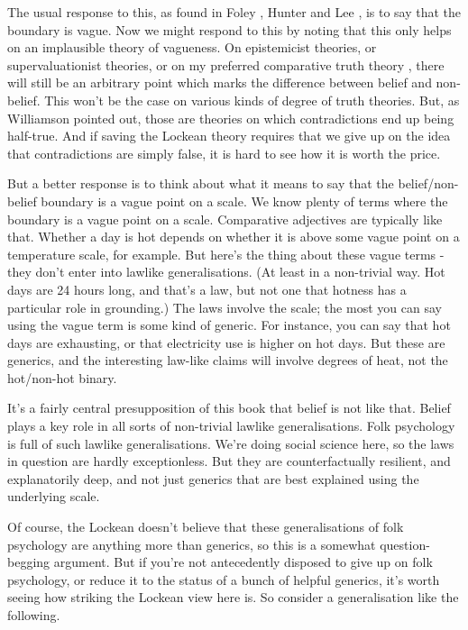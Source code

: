 \documentclass[
  11pt,
]{book}
\begin{document}
The usual response to this, as found in Foley \citeyearpar[ Ch. 4]{Foley1993}, Hunter \citeyearpar{Hunter1996} and Lee \citeyearpar{Lee2017b}, is to say that the boundary is vague. Now we might respond to this by noting that this only helps on an implausible theory of vagueness. On epistemicist theories, or supervaluationist theories, or on my preferred comparative truth theory \citep{Weatherson2005b}, there will still be an arbitrary point which marks the difference between belief and non-belief. This won't be the case on various kinds of degree of truth theories. But, as Williamson \citeyearpar{Williamson1994} pointed out, those are theories on which contradictions end up being half-true. And if saving the Lockean theory requires that we give up on the idea that contradictions are simply false, it is hard to see how it is worth the price.

But a better response is to think about what it means to say that the belief/non-belief boundary is a vague point on a scale. We know plenty of terms where the boundary is a vague point on a scale. Comparative adjectives are typically like that. Whether a day is hot depends on whether it is above some vague point on a temperature scale, for example. But here's the thing about these vague terms - they don't enter into lawlike generalisations. (At least in a non-trivial way. Hot days are 24 hours long, and that's a law, but not one that hotness has a particular role in grounding.) The laws involve the scale; the most you can say using the vague term is some kind of generic. For instance, you can say that hot days are exhausting, or that electricity use is higher on hot days. But these are generics, and the interesting law-like claims will involve degrees of heat, not the hot/non-hot binary.

It's a fairly central presupposition of this book that belief is not like that. Belief plays a key role in all sorts of non-trivial lawlike generalisations. Folk psychology is full of such lawlike generalisations. We're doing social science here, so the laws in question are hardly exceptionless. But they are counterfactually resilient, and explanatorily deep, and not just generics that are best explained using the underlying scale.

Of course, the Lockean doesn't believe that these generalisations of folk psychology are anything more than generics, so this is a somewhat question-begging argument. But if you're not antecedently disposed to give up on folk psychology, or reduce it to the status of a bunch of helpful generics, it's worth seeing how striking the Lockean view here is. So consider a generalisation like the following.
\end{document}
